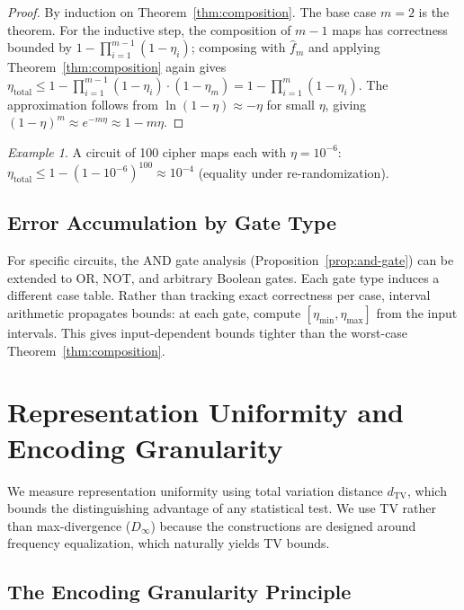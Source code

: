 \documentclass[11pt]{article}
\theoremstyle{definition}
\theoremstyle{plain}
\theoremstyle{remark}
\newtheorem{example}{Example}[section]
\newcommand{\fhat}{\hat{f}}
\newcommand{\TV}{d_{\mathrm{TV}}}
\begin{document}
\begin{proof}
By induction on Theorem~\ref{thm:composition}.  The base case $m=2$ is the
theorem.  For the inductive step, the composition of $m-1$ maps has
correctness bounded by $1 - \prod_{i=1}^{m-1}(1-\eta_i)$; composing with
$\fhat_m$ and applying Theorem~\ref{thm:composition} again gives
$\eta_{\mathrm{total}} \leq 1 - \prod_{i=1}^{m-1}(1-\eta_i) \cdot (1-\eta_m)
= 1 - \prod_{i=1}^m (1-\eta_i)$.
The approximation follows from $\ln(1-\eta) \approx -\eta$ for small
$\eta$, giving $(1-\eta)^m \approx e^{-m\eta} \approx 1 - m\eta$.
\end{proof}

\begin{example}
A circuit of 100 cipher maps each with $\eta = 10^{-6}$:
$\eta_{\mathrm{total}} \leq 1 - (1-10^{-6})^{100} \approx 10^{-4}$
(equality under re-randomization).
\end{example}

\subsection{Error Accumulation by Gate Type}

For specific circuits, the AND gate analysis
(Proposition~\ref{prop:and-gate}) can be extended to OR, NOT, and arbitrary
Boolean gates.  Each gate type induces a different case table.  Rather than
tracking exact correctness per case, interval arithmetic propagates bounds:
at each gate, compute $[\eta_{\min}, \eta_{\max}]$ from the input intervals.
This gives input-dependent bounds tighter than the worst-case
Theorem~\ref{thm:composition}.


\section{Representation Uniformity and Encoding Granularity}
\label{sec:uniformity}

We measure representation uniformity using total variation distance $\TV$,
which bounds the distinguishing advantage of any statistical test.
We use TV rather than max-divergence ($D_\infty$) because the constructions
are designed around frequency equalization, which naturally yields TV bounds.

\subsection{The Encoding Granularity Principle}
\label{subsec:granularity}
\end{document}
